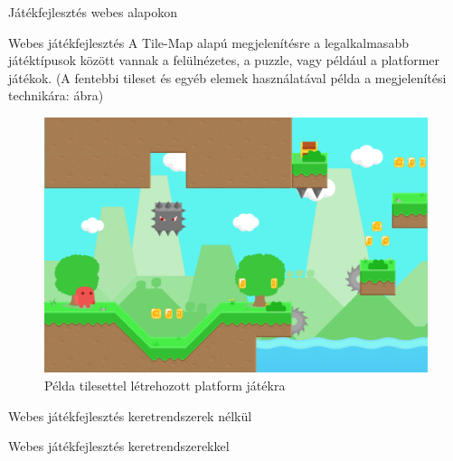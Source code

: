 \begin{MyChapter}{Játékfejlesztés webes alapokon}
\begin{MySection}{Webes játékfejlesztés}
		A Tile-Map alapú megjelenítésre a legalkalmasabb játéktípusok között vannak a felülnézetes, a puzzle, vagy például a platformer játékok. (A fentebbi tileset és egyéb elemek használatával példa a megjelenítési technikára:  ábra)
		\begin{figure}[h!]
			\centering
			\includegraphics[scale=0.35]{kepek/tileMap/TileMapPreview.png}
			\caption{Példa tilesettel létrehozott platform játékra}
			\label{fig:tileMap:tileMapPreview}
		\end{figure}
	\end{MySection}

	\begin{MySection}{Webes játékfejlesztés keretrendszerek nélkül}
	\end{MySection}

	\begin{MySection}{Webes játékfejlesztés keretrendszerekkel}
	\end{MySection}
	
\end{MyChapter}